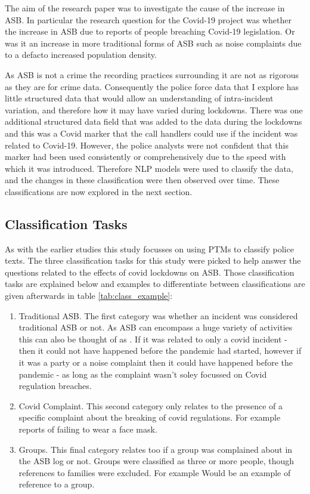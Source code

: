 The aim of the research paper was to investigate the cause of the increase in ASB. In particular the research question for the Covid-19 project was whether the increase in ASB due to reports of people breaching Covid-19 legislation. Or was it an increase in more traditional forms of ASB such as noise complaints due to a defacto increased population density. 

As ASB is not a crime the recording practices surrounding it are not as rigorous as they are for crime data. Consequently the police force data that I explore has little structured data that would allow an understanding of intra-incident variation, and therefore how it may have varied during lockdowns. There was one additional structured data field that was added to the data during the lockdowns and this was a Covid marker that the call handlers could use if the incident was related to Covid-19. However, the police analysts were not confident that this marker had been used consistently or comprehensively due to the speed with which it was introduced. Therefore NLP models were used to classify the data, and the changes in these classification were then observed over time. These classifications are now explored in the next section.
 
\subsection{Classification Tasks} As with the earlier studies this study focusses on using PTMs to classify police texts. The three classification tasks for this study were picked to help answer the questions related to the effects of covid lockdowns on ASB. Those classification tasks are explained below and examples to differentiate between classifications are given afterwards in table \ref{tab:class_example}:

\begin{enumerate}
\item{Traditional ASB.} The first category was whether an incident was considered traditional ASB or not. As ASB can encompass a huge variety of activities this can also be thought of as . If it was related to only a covid incident - then it could not have happened before the pandemic had started, however if it was a party or a noise complaint then it could have happened before the pandemic - as long as the complaint wasn't soley focussed on Covid regulation breaches.
\item{Covid Complaint.} This second category only relates to the presence of a specific complaint about the breaking of covid regulations. For example reports of failing to wear a face mask.
\item{Groups.} This final category relates too if a group was complained about in the ASB log or not. Groups were classified as three or more people, though references to families were excluded. For example  Would be an example of reference to a group.

\end{enumerate}



